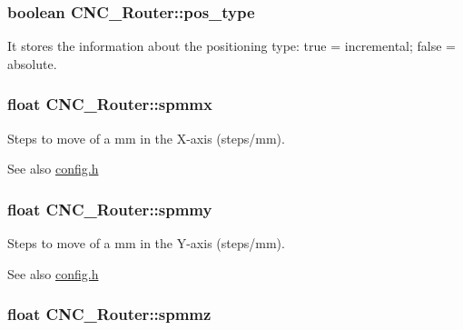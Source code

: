\hypertarget{class_c_n_c___router_afd35356064c7667cbdf21c44a7dd7cf5}{
\subsubsection[{pos\+\_\+type}]{\setlength{\rightskip}{0pt plus 5cm}boolean C\+N\+C\+\_\+\+Router\+::pos\+\_\+type\hspace{0.3cm}{\ttfamily [private]}}}\label{class_c_n_c___router_afd35356064c7667cbdf21c44a7dd7cf5}


It stores the information about the positioning type\+: true = incremental; false = absolute. 

\hypertarget{class_c_n_c___router_ad8830a7b387905027b8a1a9e3b31e3c7}{
\subsubsection[{spmmx}]{\setlength{\rightskip}{0pt plus 5cm}float C\+N\+C\+\_\+\+Router\+::spmmx\hspace{0.3cm}{\ttfamily [private]}}}\label{class_c_n_c___router_ad8830a7b387905027b8a1a9e3b31e3c7}


Steps to move of a mm in the X-\/axis (steps/mm). 

\begin{DoxySeeAlso}{See also}
\hyperlink{config_8h}{config.\+h} 
\end{DoxySeeAlso}
\hypertarget{class_c_n_c___router_ab44dd3a48e5c03f3484cd223cb8f9444}{
\subsubsection[{spmmy}]{\setlength{\rightskip}{0pt plus 5cm}float C\+N\+C\+\_\+\+Router\+::spmmy\hspace{0.3cm}{\ttfamily [private]}}}\label{class_c_n_c___router_ab44dd3a48e5c03f3484cd223cb8f9444}


Steps to move of a mm in the Y-\/axis (steps/mm). 

\begin{DoxySeeAlso}{See also}
\hyperlink{config_8h}{config.\+h} 
\end{DoxySeeAlso}
\hypertarget{class_c_n_c___router_a18bda26476d6fbe11fc6bb6ec69171ea}{
\subsubsection[{spmmz}]{\setlength{\rightskip}{0pt plus 5cm}float C\+N\+C\+\_\+\+Router\+::spmmz\hspace{0.3cm}{\ttfamily [private]}}}\label{class_c_n_c___router_a18bda26476d6fbe11fc6bb6ec69171ea}


